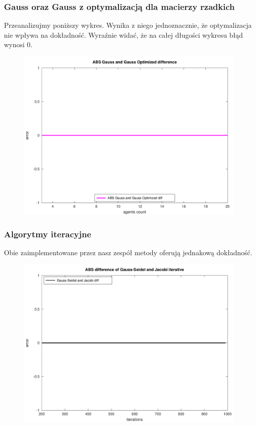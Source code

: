 \documentclass[10pt]{article}
\begin{document}
\subsubsection{Gauss oraz Gauss z optymalizacją dla macierzy rzadkich}
Przeanalizujmy poniższy wykres. Wynika z niego jednoznacznie, że optymalizacja nie wpływa na dokładność. Wyraźnie widać, że na całej długości wykresu błąd wynosi 0.
\begin{figure}[h]
\centering
\includegraphics[scale=0.43]{plots/07_abs_gauss_and_gauss_optimized_all_rows.png}
\end{figure}

\subsubsection{Algorytmy iteracyjne}
Obie zaimplementowane przez nasz zespół metody oferują jednakową dokładność.
\begin{figure}[h]
\centering
\includegraphics[scale=0.45]{plots/03_abs_iterative_methods_all_rows.png}
\end{figure}
\end{document}
